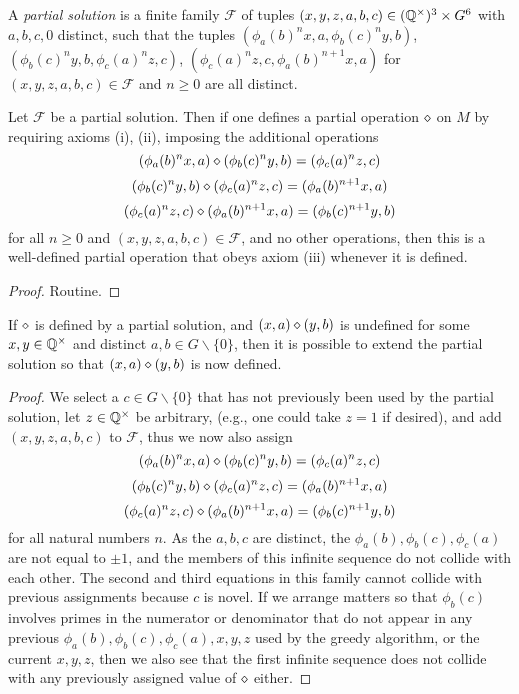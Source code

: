 \begin{definition}\label{partial-1323} A \emph{partial solution} is a finite family ${\mathcal F}$ of tuples $(x,y,z,a,b,c) \in (\mathbb{Q}^\times)^3 \times G^6$ with $a,b,c,0$ distinct, such that the tuples
$(\phi_a(b)^n x,a, \phi_b(c)^n y,b)$, $(\phi_b(c)^n y,b,\phi_c(a)^n z,c)$, $(\phi_c(a)^n z,c,\phi_a(b)^{n+1} x, a)$ for $(x,y,z,a,b,c) \in {\mathcal F}$ and $n \geq 0$ are all distinct.
\end{definition}

\begin{lemma}[Soundness]\label{partial-1323-sound}  Let ${\mathcal F}$ be a partial solution.  Then if one defines a partial operation $\diamond$ on $M$ by requiring axioms (i), (ii), imposing the additional operations
$$ (\phi_a(b)^n x,a) \diamond (\phi_b(c)^n y,b) = (\phi_c(a)^n z,c)$$
$$ (\phi_b(c)^n y,b) \diamond (\phi_c(a)^n z,c) = (\phi_a(b)^{n+1} x, a)$$
$$ (\phi_c(a)^n z,c) \diamond (\phi_a(b)^{n+1} x, a) = (\phi_b(c)^{n+1} y,b)$$
for all $n \geq 0$ and $(x,y,z,a,b,c) \in {\mathcal F}$, and no other operations, then this is a well-defined partial operation that obeys axiom (iii) whenever it is defined.
\end{lemma}

\begin{proof} Routine.
\end{proof}

\begin{lemma}\label{greedy-1323}  If $\diamond$ is defined by a partial solution, and $(x,a) \diamond (y,b)$ is undefined for some $x,y \in \mathbb{Q}^\times$ and distinct $a,b \in G \backslash \{0\}$, then it is possible to extend the partial solution so that $(x,a) \diamond (y,b)$ is now defined.
\end{lemma}

\begin{proof} We select a $c \in G \backslash \{0\}$ that has not previously been used by the partial solution, let $z \in \mathbb{Q}^\times$ be arbitrary, (e.g., one could take $z=1$ if desired), and add $(x,y,z,a,b,c)$ to ${\mathcal F}$, thus we now also assign
$$ (\phi_a(b)^n x,a) \diamond (\phi_b(c)^n y,b) = (\phi_c(a)^n z,c)$$
$$ (\phi_b(c)^n y,b) \diamond (\phi_c(a)^n z,c) = (\phi_a(b)^{n+1} x, a)$$
$$ (\phi_c(a)^n z,c) \diamond (\phi_a(b)^{n+1} x, a) = (\phi_b(c)^{n+1} y,b)$$
for all natural numbers $n$.  As the $a,b,c$ are distinct, the $\phi_a(b), \phi_b(c), \phi_c(a)$ are not equal to $\pm 1$, and the members of this infinite sequence do not collide with each other.  The second and third equations in this family cannot collide with previous assignments because $c$ is novel.  If we arrange matters so that $\phi_b(c)$ involves primes in the numerator or denominator that do not appear in any previous $\phi_a(b), \phi_b(c), \phi_c(a), x, y, z$ used by the greedy algorithm, or the current $x,y,z$, then we also see that the first infinite sequence does not collide with any previously assigned value of $\diamond$ either.
\end{proof}

